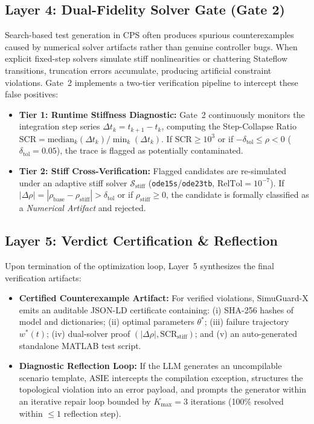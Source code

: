 \documentclass[journal]{IEEEtran}
\begin{document}
\subsection{Layer 4: Dual-Fidelity Solver Gate (Gate 2)}
Search-based test generation in CPS often produces spurious counterexamples caused by numerical solver artifacts rather than genuine controller bugs. When explicit fixed-step solvers simulate stiff nonlinearities or chattering Stateflow transitions, truncation errors accumulate, producing artificial constraint violations. Gate~2 implements a two-tier verification pipeline to intercept these false positives:
\begin{itemize}
    \item \textbf{Tier 1: Runtime Stiffness Diagnostic:} Gate~2 continuously monitors the integration step series $\Delta t_k = t_{k+1} - t_k$, computing the Step-Collapse Ratio $\text{SCR} = \text{median}_k(\Delta t_k) / \min_k(\Delta t_k)$. If $\text{SCR} \ge 10^3$ or if $-\delta_{\text{tol}} \le \rho < 0$ ($\delta_{\text{tol}} = 0.05$), the trace is flagged as potentially contaminated.
    \item \textbf{Tier 2: Stiff Cross-Verification:} Flagged candidates are re-simulated under an adaptive stiff solver $\mathcal{S}_{\text{stiff}}$ (\texttt{ode15s}/\texttt{ode23tb}, $\text{RelTol} = 10^{-7}$). If $|\Delta \rho| = |\rho_{\text{base}} - \rho_{\text{stiff}}| > \delta_{\text{tol}}$ or if $\rho_{\text{stiff}} \ge 0$, the candidate is formally classified as a \textit{Numerical Artifact} and rejected.
\end{itemize}

\subsection{Layer 5: Verdict Certification \& Reflection}
Upon termination of the optimization loop, Layer~5 synthesizes the final verification artifacts:
\begin{itemize}
    \item \textbf{Certified Counterexample Artifact:} For verified violations, SimuGuard-X emits an auditable JSON-LD certificate containing: (i) SHA-256 hashes of model and dictionaries; (ii) optimal parameters $\theta^*$; (iii) failure trajectory $w^*(t)$; (iv) dual-solver proof $(|\Delta \rho|, \text{SCR}_{\text{stiff}})$; and (v) an auto-generated standalone MATLAB test script.
    \item \textbf{Diagnostic Reflection Loop:} If the LLM generates an uncompilable scenario template, ASIE intercepts the compilation exception, structures the topological violation into an error payload, and prompts the generator within an iterative repair loop bounded by $K_{\max} = 3$ iterations (100\% resolved within $\le 1$ reflection step).
\end{itemize}
\end{document}
